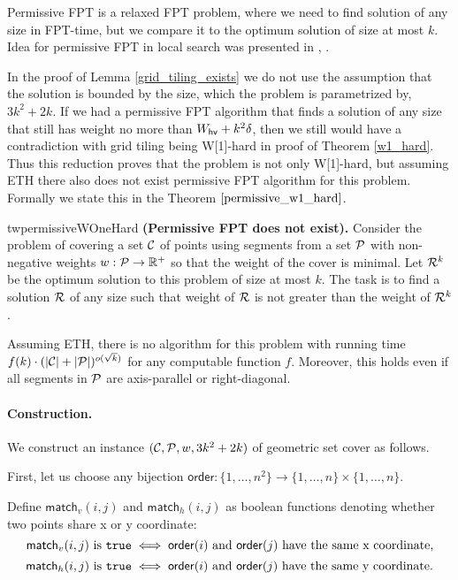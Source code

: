 Permissive FPT is a relaxed FPT problem, where 
we need to find solution of any size in FPT-time,
but we compare it to the optimum solution of size at most $k$.
Idea for permissive FPT in local search was presented in \cite{permissive_problem1}, \cite{permissive_problem2}.

In the proof of Lemma \ref{grid_tiling_exists}
we do not use the assumption that
the solution is bounded by the size,
which the problem is parametrized by, $3k^2+2k$.
If we had a permissive FPT algorithm
that finds a solution of any size that still
has weight no more than $W_{\mathsf{hv}}+k^2\delta$,
then we still would have a contradiction with grid tiling being W[1]-hard
in proof of Theorem \ref{w1_hard}.
Thus this reduction
proves that the problem is not only W[1]-hard, but assuming ETH 
there also does not exist permissive FPT algorithm for this problem.
Formally we state this in the Theorem $\ref{permissive_w1_hard}$.


\begin{restatable}{tw}{permissiveWOneHard}
\label{permissive_w1_hard}
\textbf{(Permissive FPT does not exist).}
	Consider the problem of covering a set $\mathcal{C}$ of points
	using segments from a set $\mathcal{P}$ 
	with non-negative weights $w : \mathcal{P} \rightarrow \mathbb{R^+}$
	so that the weight of the cover is minimal.
	Let $\mathcal{R}^k$ be the
	optimum solution to this problem of size at most $k$.
	The task is to find a solution $\mathcal{R}$ of any size
	such that weight of $\mathcal{R}$ is not greater than the weight of $\mathcal{R}^k$.
	
	Assuming ETH, there is no algorithm for this
	problem with running time
	$f(k)\cdot(|\mathcal{C}| + |\mathcal{P}|)^{o(\sqrt{k})}$
	for any computable function $f$.
	Moreover, this holds even if all segments in $\mathcal{P}$
	are axis-parallel or right-diagonal.
\end{restatable}

\paragraph{Construction.}
\newcommand{\order}{\mathsf{order}}
\newcommand{\matchv}{\mathsf{match}_v}
\newcommand{\matchh}{\mathsf{match}_h}

We construct an instance $(\mathcal{C}, \mathcal{P}, w, 3k^2+2k)$ of geometric set cover as follows.

First, let us choose any bijection
$\order : \{1, \ldots, n^2\} \rightarrow \{1, \ldots, n\} \times \{1, \ldots, n\}$.


Define $\matchv(i, j)$ and $\matchh(i, j)$
as boolean functions denoting whether two points share x or y coordinate:
$$\matchv(i, j) \text{ is } \true \iff
\order(i) \text{ and } \order(j) \text{ have the same x coordinate,}$$
$$\matchh(i, j) \text{ is } \true \iff
\order(i) \text{ and } \order(j) \text{ have the same y coordinate.}$$


